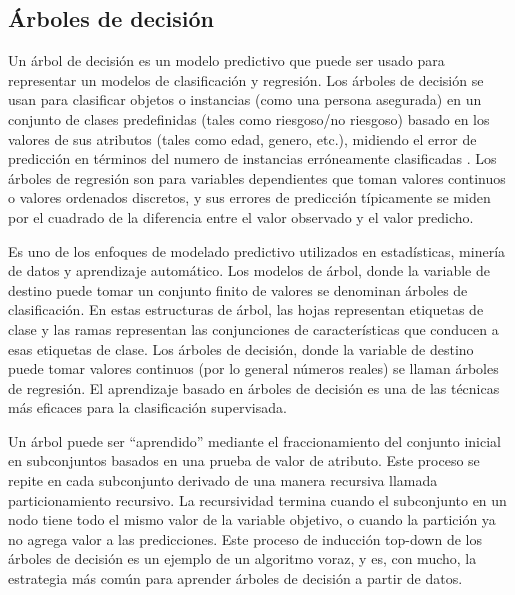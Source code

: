 \subsection{Árboles de decisión}
Un árbol de decisión es un modelo predictivo que puede ser usado para representar un modelos de clasificación y regresión. 
Los árboles de decisión se usan para clasificar objetos o instancias (como una persona asegurada) en un conjunto de clases predefinidas (tales como riesgoso/no riesgoso) basado en los valores de sus atributos (tales como edad, genero, etc.), midiendo el error de predicción en términos del numero de instancias erróneamente clasificadas \cite{RokachLiorMaimonDataMiningDecisionTrees}.
Los árboles de regresión son para variables dependientes que toman valores continuos o valores ordenados discretos, y sus errores de predicción típicamente se miden por el cuadrado de la diferencia entre el valor observado y el valor predicho. \cite{LohWei-YinClassificationAndRegressionTrees}


Es uno de los enfoques de modelado predictivo utilizados en estadísticas, minería de datos y aprendizaje automático. 
Los modelos de árbol, donde la variable de destino puede tomar un conjunto finito de valores se denominan árboles de clasificación. 
En estas estructuras de árbol, las hojas representan etiquetas de clase y las ramas representan las conjunciones de características que conducen a esas etiquetas de clase. 
Los árboles de decisión, donde la variable de destino puede tomar valores continuos (por lo general números reales) se llaman árboles de regresión. El aprendizaje basado en árboles de decisión es una de las técnicas más eficaces para la clasificación supervisada.

Un árbol puede ser ``aprendido'' mediante el fraccionamiento del conjunto inicial en subconjuntos basados en una prueba de valor de atributo. 
Este proceso se repite en cada subconjunto derivado de una manera recursiva llamada particionamiento recursivo. 
La recursividad termina cuando el subconjunto en un nodo tiene todo el mismo valor de la variable objetivo, o cuando la partición ya no agrega valor a las predicciones. 
Este proceso de inducción top-down de los árboles de decisión \cite{InductionofDecisionTrees1986}
es un ejemplo de un algoritmo voraz, y es, con mucho, la estrategia más común para aprender árboles de decisión a partir de datos.

